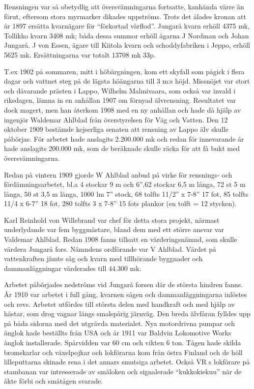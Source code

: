 Rensningen var så obetydlig att översvämningarna 	fortsatte, kanhända värre än förut, eftersom stora myrmarker dikades uppströms. Trots det ålades kronan att år 1897 ersätta kvarnägare för ``förkortad vårflod''. Jungarå kvarn erhöll 4375 mk, Tollikko kvarn 3408 mk; båda dessa summor erhöll ägarna J Nordman och Johan Jungarå. J von Essen, ägare till Kiitola kvarn och schoddyfabriken i Jeppo, erhöll 5625 mk. Ersättningarna var totalt 13708 mk 33p.

T.ex 1902 på sommaren, mitt i höbärgningen, kom ett skyfall som pågick i flera dagar och vattnet steg på de lägsta höängarna till 3 m:s höjd. Missnöjet var stort och dåvarande prästen i Lappo, Wilhelm Malmivaara, som också var invald i riksdagen, lämna in en anhållan 1907 om förnyad älvrensning. Resultatet var dock magert, men han återkom 1908 med en ny anhållan och hade då hjälp av ingenjör Waldemar Ahlblad från överstyrelsen 	för Väg och Vatten. Den 12 oktober 1909 bestämde kejserliga senaten att rensning av Lappo älv skulle påbörjas. För arbetet hade anslagits 2.200.000 mk och redan för innevarande år hade anslagits 200.000 mk, som de beräknade skulle räcka för att få bukt med översvämningarna.

Redan på vintern 1909 gjorde W Ahlblad anbud på virke för rensnings- och 	fördämningsarbetet, bl.a 4 stockar 9 m och 6”,62 stockar 6,5 m långa, 72 st 5 m långa, 50 st 3,5 m långa, 1000 lm 7” stock, 68 tolfts 11/2” x 7-8” 17 fot, 85 tolfts 11/4 x 6-7” 18 fot, 280 tolfts 3 x 7-8” 15 fots plankor (en tolft = 12 stycken).

Karl Reinhold von Willebrand var chef för detta stora projekt, närmast underlydande var fem byggmästare, bland dem med ett större ansvar var Valdemar Ahlblad. Redan 1908 fanns tillsatt en värderingsnämnd, som skulle värdera Jungarå fors. Nämndens ordförande var V Ahlblad. Värdet på vattenkraften jämte såg och kvarn med tillhörande byggnader och dammanläggningar värderades till 44.300 mk.

Arbetet påbörjades nedströms vid Jungarå forsen där de största 	hindren fanns. År 1910 var arbetet i full gång, kvarnen sågen och dammanläggningarna inlöstes och revs. Arbetet utfördes till största delen med handkraft och med hjälp av hästar, som drog vagnar längs smalspårig järnväg. Den breda älvfåran fylldes upp 	på båda sidorna med det utgrävda materialet. Nya motordrivna pumpar och ånglok hade beställts från USA och år 1911 var Baldvin Lokomotive Works ånglok installerade. Spårvidden var 60 cm och vikten 6 ton. Tågen hade skilda bromskarlar och växelpojkar och lokförarna kom från östra Finland och de höll lilleputtarna skinade rena i det annars smutsiga arbetet. Också VR s lokförare på stambanan var intresserade av småloken och 	signalerade ``kukkokiekuu'' när de åkte förbi och småtågen svarade.

